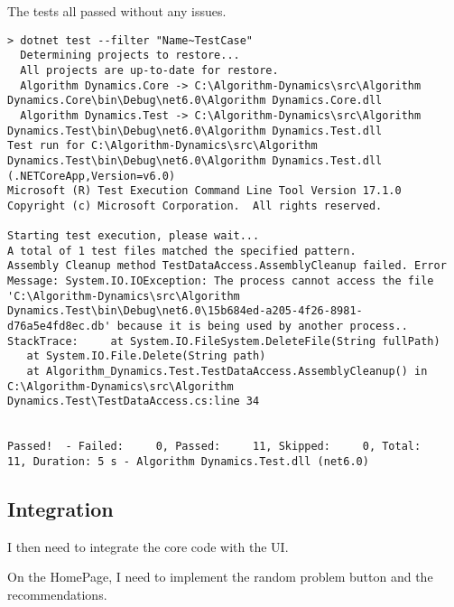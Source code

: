 \documentclass[report.tex]{subfiles}
\begin{document}
The tests all passed without any issues.

\begin{verbatim}
> dotnet test --filter "Name~TestCase"
  Determining projects to restore...
  All projects are up-to-date for restore.
  Algorithm Dynamics.Core -> C:\Algorithm-Dynamics\src\Algorithm Dynamics.Core\bin\Debug\net6.0\Algorithm Dynamics.Core.dll
  Algorithm Dynamics.Test -> C:\Algorithm-Dynamics\src\Algorithm Dynamics.Test\bin\Debug\net6.0\Algorithm Dynamics.Test.dll
Test run for C:\Algorithm-Dynamics\src\Algorithm Dynamics.Test\bin\Debug\net6.0\Algorithm Dynamics.Test.dll (.NETCoreApp,Version=v6.0)
Microsoft (R) Test Execution Command Line Tool Version 17.1.0
Copyright (c) Microsoft Corporation.  All rights reserved.

Starting test execution, please wait...
A total of 1 test files matched the specified pattern.
Assembly Cleanup method TestDataAccess.AssemblyCleanup failed. Error Message: System.IO.IOException: The process cannot access the file 'C:\Algorithm-Dynamics\src\Algorithm Dynamics.Test\bin\Debug\net6.0\15b684ed-a205-4f26-8981-d76a5e4fd8ec.db' because it is being used by another process.. StackTrace:     at System.IO.FileSystem.DeleteFile(String fullPath)
   at System.IO.File.Delete(String path)
   at Algorithm_Dynamics.Test.TestDataAccess.AssemblyCleanup() in C:\Algorithm-Dynamics\src\Algorithm Dynamics.Test\TestDataAccess.cs:line 34


Passed!  - Failed:     0, Passed:     11, Skipped:     0, Total:     11, Duration: 5 s - Algorithm Dynamics.Test.dll (net6.0)
\end{verbatim}


\subsection{Integration}

I then need to integrate the core code with the UI.

On the HomePage, I need to implement the random problem button and the recommendations.
\end{document}
